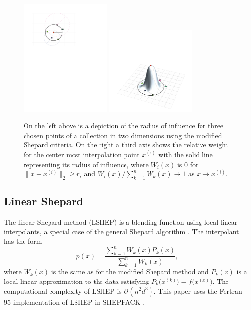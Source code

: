 \begin{figure}
  \centering
  \includegraphics[width=0.4\textwidth,]{Figures/NA/example_shepard_radius.pdf}
  \hspace{.2cm}
  \includegraphics[width=0.4\textwidth,]{Figures/NA/example_shepard_weight.pdf}
  \caption{On the left above is a depiction of the radius
    of influence for three chosen points of a collection in two
    dimensions using the modified Shepard criteria. On the right a
    third axis shows the relative weight for the center most
    interpolation point $x^{(i)}$ with the solid line representing its
    radius of influence, where $W_i(x)$ is $0$ for $\|x-x^{(i)}\|_2
    \geq r_i$ and $W_i(x) / \sum_{k=1}^n W_k(x) \to 1$ as $x \to
    x^{(i)}$.
  \vspace{-.1cm}}
  \label{fig:shepard}
\end{figure}


\subsection{Linear Shepard}
The linear Shepard method (LSHEP) is a blending function using local
linear interpolants, a special case of the general Shepard algorithm
\cite{thacker2010algorithm}. The interpolant has the form
 $$ p(x) = \frac{\sum\limits_{k=1}^{n}W_k(x)P_k(x)}
 {\sum\limits_{k=1}^{n}W_k(x)} ,$$
where $W_k(x)$ is the same as for the modified Shepard method and
$P_k(x)$ is a local linear approximation to the data satisfying
$P_k\bigl(x^{(k)}\bigr) = f\bigl(x^{(x)}\bigr)$. The computational
complexity of LSHEP is $\mathcal{O}(n^2d^3)$. This paper uses the
Fortran 95 implementation of LSHEP in SHEPPACK
\cite{thacker2010algorithm}.
